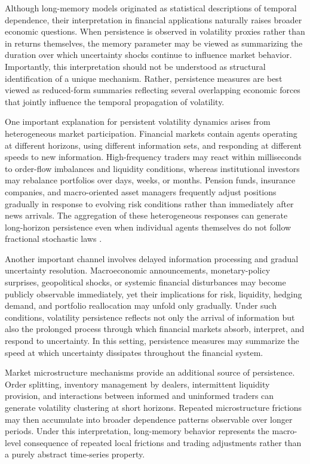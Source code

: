 \documentclass[unnumsec,webpdf,contemporary,large]{oup-authoring-template}%
\theoremstyle{thmstyleone}%
\theoremstyle{thmstyletwo}%
\theoremstyle{thmstylethree}%
\begin{document}
Although long-memory models originated as statistical descriptions of
temporal dependence, their interpretation in financial applications
naturally raises broader economic questions. When persistence is observed in
volatility proxies rather than in returns themselves, the memory parameter
may be viewed as summarizing the duration over which uncertainty shocks
continue to influence market behavior. Importantly, this interpretation
should not be understood as structural identification of a unique mechanism.
Rather, persistence measures are best viewed as reduced-form summaries
reflecting several overlapping economic forces that jointly influence the
temporal propagation of volatility.

One important explanation for persistent volatility dynamics arises from
heterogeneous market participation. Financial markets contain agents
operating at different horizons, using different information sets, and
responding at different speeds to new information. High-frequency traders
may react within milliseconds to order-flow imbalances and liquidity
conditions, whereas institutional investors may rebalance portfolios over
days, weeks, or months. Pension funds, insurance companies, and
macro-oriented asset managers frequently adjust positions gradually in
response to evolving risk conditions rather than immediately after news
arrivals. The aggregation of these heterogeneous responses can generate
long-horizon persistence even when individual agents themselves do not
follow fractional stochastic laws
\citep{muller1997volatilities,corsi2009simple}.

Another important channel involves delayed information processing and
gradual uncertainty resolution. Macroeconomic announcements,
monetary-policy surprises, geopolitical shocks, or systemic financial
disturbances may become publicly observable immediately, yet their
implications for risk, liquidity, hedging demand, and portfolio reallocation
may unfold only gradually. Under such conditions, volatility persistence
reflects not only the arrival of information but also the prolonged process
through which financial markets absorb, interpret, and respond to
uncertainty. In this setting, persistence measures may summarize the speed
at which uncertainty dissipates throughout the financial system.

Market microstructure mechanisms provide an additional source of
persistence. Order splitting, inventory management by dealers, intermittent
liquidity provision, and interactions between informed and uninformed
traders can generate volatility clustering at short horizons. Repeated
microstructure frictions may then accumulate into broader dependence
patterns observable over longer periods. Under this interpretation,
long-memory behavior represents the macro-level consequence of repeated
local frictions and trading adjustments rather than a purely abstract
time-series property.
\end{document}
